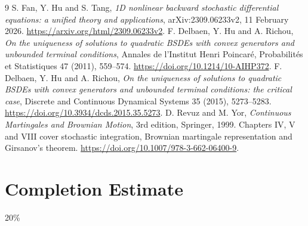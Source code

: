 \documentclass[11pt]{article}
\begin{document}
\begin{thebibliography}{9}
 S. Fan, Y. Hu and S. Tang,
\emph{1D nonlinear backward stochastic differential equations: a unified theory and applications}, arXiv:2309.06233v2, 11 February 2026.
\url{https://arxiv.org/html/2309.06233v2}.
 F. Delbaen, Y. Hu and A. Richou,
\emph{On the uniqueness of solutions to quadratic BSDEs with convex generators
and unbounded terminal conditions}, Annales de l'Institut Henri Poincar\'e,
Probabilit\'es et Statistiques 47 (2011), 559--574.
\url{https://doi.org/10.1214/10-AIHP372}.
 F. Delbaen, Y. Hu and A. Richou,
\emph{On the uniqueness of solutions to quadratic BSDEs with convex generators
and unbounded terminal conditions: the critical case}, Discrete and Continuous
Dynamical Systems 35 (2015), 5273--5283.
\url{https://doi.org/10.3934/dcds.2015.35.5273}.
 D. Revuz and M. Yor, \emph{Continuous Martingales and Brownian Motion},
3rd edition, Springer, 1999. Chapters IV, V and VIII cover stochastic
integration, Brownian martingale representation and Girsanov's theorem.
\url{https://doi.org/10.1007/978-3-662-06400-9}.
\end{thebibliography}
\section{Completion Estimate}
20\%
\end{document}
